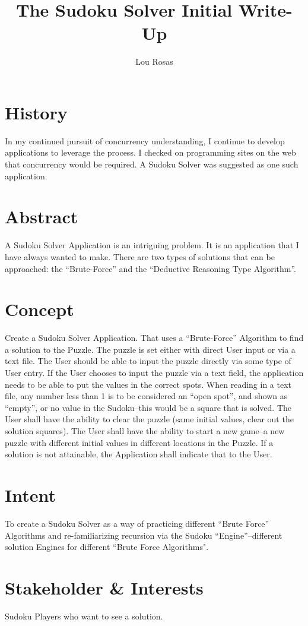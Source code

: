 \documentclass[letterpaper]{article}
\begin{document}
\title{The Sudoku Solver Initial Write-Up}
\author{Lou Rosas}
\maketitle

\section{History}
In my continued pursuit of concurrency understanding, I continue to
develop applications to leverage the process.  I checked on
programming sites on the web that concurrency would be required.  A
Sudoku Solver was suggested as one such application.

\section{Abstract}
A Sudoku Solver Application is an intriguing problem.  It is an
application that I have always wanted to make.  There are two types of
solutions that can be approached:  the ``Brute-Force” and the 
``Deductive Reasoning Type Algorithm”.

\section{Concept}
Create a Sudoku Solver Application.  That uses a ``Brute-Force”
Algorithm to find a solution to the Puzzle.  The puzzle is set either
with direct User input or via a text file.  The User should be able to
input the puzzle directly via some type of User entry.  If the User
chooses to input the puzzle via a text field, the application needs to
be able to put the values in the correct spots.  When reading in a
text file, any number less than 1 is to be considered an ``open spot”,
and shown as ``empty”, or no value in the Sudoku--this would be a
square that is solved.  The User shall have the ability to clear the
puzzle (same initial values, clear out the solution squares).  The
User shall have the ability to start a new game--a new puzzle with
different initial values in different locations in the Puzzle.  If a
solution is not attainable, the Application shall indicate that to the
User.

\section{Intent}
To create a Sudoku Solver as a way of practicing different ``Brute
Force” Algorithms and re-familiarizing recursion via the Sudoku 
``Engine”--different solution Engines for different ``Brute Force
Algorithms".

\section{Stakeholder \& Interests}
Sudoku Players who want to see a solution.
\end{document}
